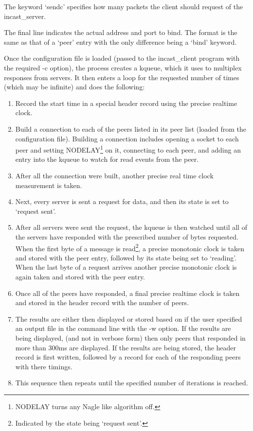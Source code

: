 \documentclass[12pt]{article}
\begin{document}
The keyword `sendc' specifies how many packets the client should request of the incast\_server.

The final line indicates the actual address and port to bind. The format is the same as that
of a `peer' entry with the only difference being a `bind' keyword.

Once the configuration file is loaded (passed to the incast\_client program with the required
-c option), the process creates a kqueue, which it uses to multiplex responses from
servers. It then enters a loop for the requested number of times (which may be infinite) and
does the following:

\newpage

\begin{enumerate}

\item Record the start time in a special header record using the precise realtime clock.

\item Build a connection to each of the peers listed in its peer list (loaded from the configuration
file). Building a connection includes opening a socket to each peer and setting NODELAY\footnote{NODELAY turns 
any Nagle\cite{rfc896} like algorithm off.} on it, connecting to each peer, and adding an entry into 
the kqueue to watch for read events from the peer.

\item After all the connection were built, another precise real time clock measurement is
taken.

\item Next, every server is sent a request for data, and then its state is set to `request sent'.

\item After all servers were sent the request, the kqueue is then watched until all of the servers
have responded with the prescribed number of bytes requested. When the first byte of a
message is read\footnote{Indicated by the state being `request sent'.}, a precise monotonic clock
is taken and stored with the peer entry, followed by its state being set to `reading'. When the last byte of a request arrives another 
precise monotonic clock is again taken and stored with the peer entry.

\item Once all of the peers have responded, a final precise realtime clock is taken and stored
in the header record with the number of peers.

\item The results are either then displayed or stored based on
if the user specified an output file in the command line with the -w option. If the results are being
displayed, (and not in verbose form) then only peers that responded in more than 300ms are displayed.
If the results are being stored, the header record is first written, followed by a record for each of the
responding peers with there timings.

\item This sequence then repeats until the specified number of iterations is reached.

\end{enumerate}
\end{document}
